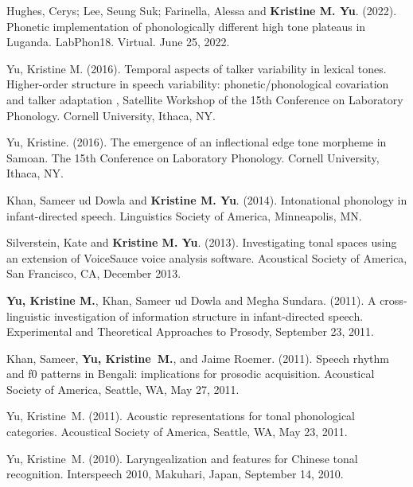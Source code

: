 \documentclass[10pt]{article}
\begin{document}
\begin{bibenum}

\item Hughes, Cerys; Lee, Seung Suk; Farinella, Alessa and \textbf{Kristine M. Yu}. (2022). Phonetic implementation of phonologically different high tone plateaus in Luganda. LabPhon18. Virtual. June 25, 2022.

\item Yu, Kristine M. (2016). Temporal aspects of talker variability in lexical tones. Higher-order structure in speech variability: phonetic/phonological covariation and talker adaptation
, Satellite Workshop of the 15th Conference on Laboratory
  Phonology. Cornell University, Ithaca, NY.

\item Yu, Kristine. (2016). The emergence of an inflectional edge tone
  morpheme in Samoan. The 15th Conference on Laboratory
  Phonology. Cornell University, Ithaca, NY.

\item Khan, Sameer ud Dowla and \textbf{Kristine M. Yu}. (2014). Intonational phonology
  in infant-directed speech. Linguistics Society of America, Minneapolis, MN.

\item Silverstein, Kate and \textbf{Kristine M. Yu}. (2013). Investigating
  tonal spaces using an extension of VoiceSauce voice analysis
  software. Acoustical Society of America, San Francisco, CA, December 2013.

\item \textbf{Yu, Kristine M.}, Khan, Sameer ud Dowla and Megha Sundara. (2011). A cross-linguistic
investigation of information structure in infant-directed
speech. Experimental and Theoretical Approaches to Prosody, September 23, 2011.

\item Khan, Sameer, \textbf{Yu, Kristine~M.}, and Jaime Roemer. (2011). Speech rhythm and f0 patterns
in Bengali: implications for prosodic acquisition. Acoustical
Society of America, Seattle, WA, May 27, 2011.

\item Yu, Kristine~M. (2011). Acoustic representations for tonal phonological
categories. Acoustical Society of America, Seattle, WA, May
23, 2011.

\item Yu, Kristine~M. (2010). Laryngealization and features for Chinese tonal
recognition. Interspeech 2010, Makuhari, Japan, September 14, 2010.


\end{bibenum}
\end{document}
